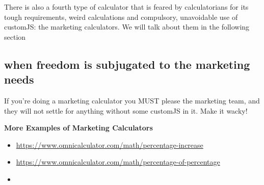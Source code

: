 There is also a fourth type of calculator that is feared by calculatorians for its tough requirements, weird calculations and compulsory, unavoidable use of customJS: the marketing calculators. We will talk about them in the following section

\subsection{when freedom is subjugated to the marketing needs}
\label{sub:marketing}
If you're doing a marketing calculator you MUST please the marketing team, and they will not settle for anything without some customJS in it. Make it wacky!


\textbf{More Examples of Marketing Calculators}
\begin{itemize}
    \item \href{Percentage Increase Calculator}{https://www.omnicalculator.com/math/percentage-increase}
    \item \href{Percentage of a Percentage Calculator}{https://www.omnicalculator.com/math/percentage-of-percentage}
    \item \href{Calculator}{}
\end{itemize}

    
